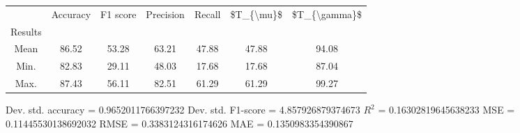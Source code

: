 \begin{tabular}{|c|c|c|c|c|c|c|}
\toprule
{} &  Accuracy &  F1 score &  Precision &  Recall &  \$T\_\{\textbackslash mu\}\$ &  \$T\_\{\textbackslash gamma\}\$ \\
Results &           &           &            &         &            &               \\
\hline
Mean    &     86.52 &     53.28 &      63.21 &   47.88 &      47.88 &         94.08 \\
Min.    &     82.83 &     29.11 &      48.03 &   17.68 &      17.68 &         87.04 \\
Max.    &     87.43 &     56.11 &      82.51 &   61.29 &      61.29 &         99.27 \\
\bottomrule
\end{tabular}

 Dev. std. accuracy = 0.9652011766397232
 Dev. std. F1-score = 4.857926879374673
 $R^2$ = 0.16302819645638233
 MSE = 0.11445530138692032
 RMSE = 0.3383124316174626
 MAE = 0.1350983354390867